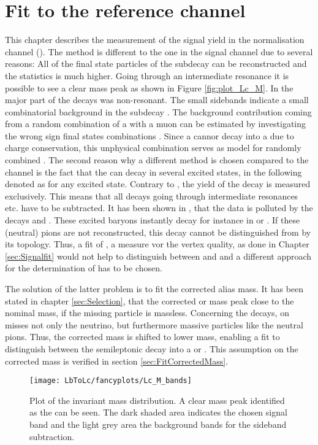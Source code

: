 \chapter{Fit to the reference channel \LbToLcmunu}
\label{sec:Normalisationfit}
This chapter describes the measurement of the signal yield \NLc in the normalisation channel \LbToLcmunu (\LcTopKpi). 
The method is different to the one in the signal channel \LbToDpmunuX due to several reasons:
All of the final state particles of the subdecay \LcTopKpi can be reconstructed and the statistics is much higher. 
Going through an intermediate resonance it is possible to see a clear \Lc mass peak as shown in Figure \ref{fig:plot_Lc_M}.
In \LbToDpmunuX the major part of the decays was non-resonant.
The small sidebands indicate a small combinatorial background in the subdecay \LcTopKpi.
The background contribution coming from a random combination of a \Lc with a muon can be estimated by investigating the wrong sign final states combinations \Lc\mup.
Since a \Lb cannor decay into a \Lc\mup due to charge conservation, this unphysical combination serves as model for randomly combined \Lc\mun.
The second reason why a different method is chosen compared to the \LbToDpmunuX channel is the fact that the \Lb can decay in several excited \Lc states, in the following denoted as \Lcstar for any excited \Lc state.
Contrary to \LbToDpmunuX, the yield of the decay \LbToLcmunu is measured exclusively.
This means that all decays going through intermediate resonances etc. have to be subtracted.
It has been shown in \cite{SL_Vub}, that the \LbToLcmunu data is polluted by the decays  and .
These excited \Lcstar baryons instantly decay for instance in \Lc\pip\pim or \Lc\piz. 
If these (neutral) pions are not reconstructed, this decay cannot be distinguished from \LbToLcmunu by its topology.
Thus, a fit of \logIP, a measure vor the vertex quality, as done in Chapter \ref{sec:Signalfit} would not help to distinguish between \LbToLcmunu and \decay{\Lb}{\Lcstar\mun\neumb} and a different approach for the determination of \NLc has to be chosen.

The solution of the latter problem is to fit the corrected \pKpi\mun alias \Lb mass.
It has been stated in chapter \ref{sec:Selection}, that the corrected \pKpi\mun or \Lb mass peak close to the nominal \Lb mass, if the missing particle is massless.
Concerning the \decay{\Lb}{\Lcstar\mun\neumb} decays, on misses not only the neutrino, but furthermore massive particles like the neutral pions.
Thus, the corrected \Lb mass is shifted to lower mass, enabling a fit to distinguish between the semileptonic \Lb decay into a \Lc or \Lcstar.
This assumption on the corrected mass is verified in section \ref{sec:FitCorrectedMass}.
\begin{figure}[tb]
    \centering
	\texttt{[image: LbToLc/fancyplots/Lc\_M\_bands]}	
	\caption{Plot of the invariant \pKpi mass distribution. A clear mass peak identified as the \Lc can be seen. The dark shaded area indicates the chosen signal band and the light grey area the background bands for the sideband subtraction.}
	\label{fig:plot_Lc_M_bands}
\end{figure}

